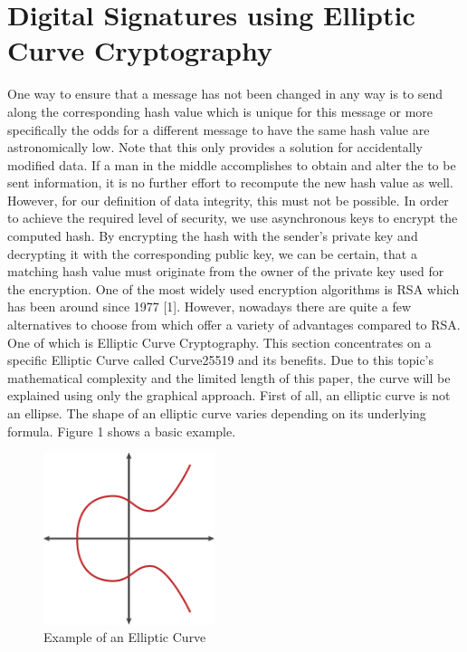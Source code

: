 \section{Digital Signatures using Elliptic Curve Cryptography}

One way to ensure that a message has not been changed in any way is to send along the corresponding hash value which is unique for this message or more specifically the odds for a different message to have the same hash value are astronomically low. Note that this only provides a solution for accidentally modified data. If a man in the middle accomplishes to obtain and alter the to be sent information, it is no further effort to recompute the new hash value as well. However, for our definition of data integrity, this must not be possible. In order to achieve the required level of security, we use asynchronous keys to encrypt the computed hash. By encrypting the hash with the sender’s private key and decrypting it with the corresponding public key, we can be certain, that a matching hash value must originate from the owner of the private key used for the encryption. 
One of the most widely used encryption algorithms is RSA which has been around since 1977 [1]. However, nowadays there are quite a few alternatives to choose from which offer a variety of advantages compared to RSA. One of which is Elliptic Curve Cryptography. This section concentrates on a specific Elliptic Curve called Curve25519 and its benefits.
Due to this topic’s mathematical complexity and the limited length of this paper, the curve will be explained using only the graphical approach.
First of all, an elliptic curve is not an ellipse. The shape of an elliptic curve varies depending on its underlying formula. Figure 1 shows a basic example.
\begin{figure}
\centering
\includegraphics[width=5cm]{Pages/EC/ec.png}
\caption{Example of an Elliptic Curve}
\end{figure}

